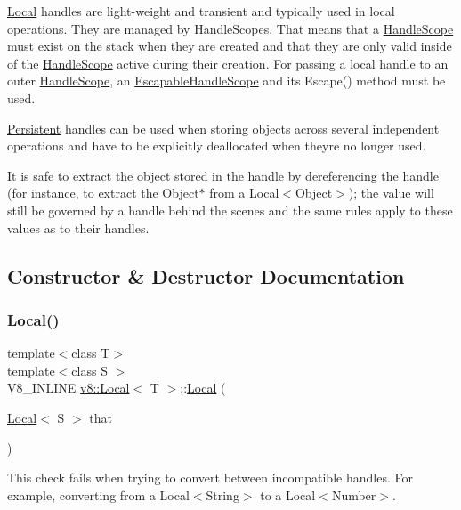 \mbox{\hyperlink{classv8_1_1Local}{Local}} handles are light-\/weight and transient and typically used in local operations. They are managed by Handle\+Scopes. That means that a \mbox{\hyperlink{classv8_1_1HandleScope}{Handle\+Scope}} must exist on the stack when they are created and that they are only valid inside of the \mbox{\hyperlink{classv8_1_1HandleScope}{Handle\+Scope}} active during their creation. For passing a local handle to an outer \mbox{\hyperlink{classv8_1_1HandleScope}{Handle\+Scope}}, an \mbox{\hyperlink{classv8_1_1EscapableHandleScope}{Escapable\+Handle\+Scope}} and its Escape() method must be used.

\mbox{\hyperlink{classv8_1_1Persistent}{Persistent}} handles can be used when storing objects across several independent operations and have to be explicitly deallocated when they\textquotesingle{}re no longer used.

It is safe to extract the object stored in the handle by dereferencing the handle (for instance, to extract the Object$\ast$ from a Local$<$\+Object$>$); the value will still be governed by a handle behind the scenes and the same rules apply to these values as to their handles. 

\subsection{Constructor \& Destructor Documentation}
\mbox{\label{classv8_1_1Local_a18d761713c1062a38f58a568fffe8f80}} 
\subsubsection{\texorpdfstring{Local()}{Local()}}
{\footnotesize\ttfamily template$<$class T$>$ \\
template$<$class S $>$ \\
V8\+\_\+\+I\+N\+L\+I\+NE \mbox{\hyperlink{classv8_1_1Local}{v8\+::\+Local}}$<$ T $>$\+::\mbox{\hyperlink{classv8_1_1Local}{Local}} (\begin{DoxyParamCaption}\item[{\mbox{\hyperlink{classv8_1_1Local}{Local}}$<$ S $>$}]{that }\end{DoxyParamCaption})\hspace{0.3cm}{\ttfamily [inline]}}

This check fails when trying to convert between incompatible handles. For example, converting from a Local$<$\+String$>$ to a Local$<$\+Number$>$.

